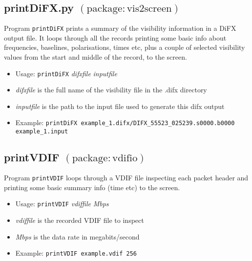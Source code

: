 \subsection{printDiFX.py {\small $\mathrm{(package: vis2screen)}$} \label{sec:printDiFX}}

Program {\tt printDiFX} prints a summary of the visibility information in a DiFX output file.  It loops through all the records printing some basic info about frequencies, baselines, polarisations, times etc, plus a couple of selected visibility values from the start and middle of the record, to the screen.

\begin{itemize}
\item[] Usage: {\tt printDiFX} {\em difxfile} {\em inputfile}

\item[] {\em difxfile} is the full name of the visibility file in the .difx directory
\item[] {\em inputfile} is the path to the input file used to generate this difx output
\end{itemize}
\begin{itemize}
\item[] Example: {\tt printDiFX example\_1.difx/DIFX\_55523\_025239.s0000.b0000 example\_1.input}
\end{itemize}





\subsection{printVDIF {\small $\mathrm{(package: vdifio)}$} \label{sec:printVDIF}}

Program {\tt printVDIF} loops through a VDIF file inspecting each packet header and printing some basic summary info (time etc) to the screen.

\begin{itemize}
\item[] Usage: {\tt printVDIF} {\em vdiffile} {\em Mbps}

\item[] {\em vdiffile} is the recorded VDIF file to inspect
\item[] {\em Mbps} is the data rate in megabits/second

\item[] Example: {\tt printVDIF example.vdif 256}
\end{itemize}



